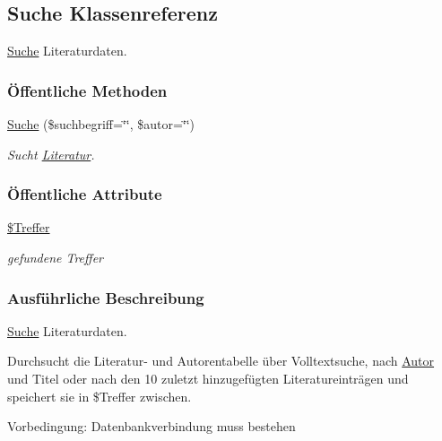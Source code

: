 \hypertarget{classSuche}{
\subsection{Suche Klassenreferenz}
\label{classSuche}
}
\hyperlink{classSuche}{Suche} Literaturdaten.  


\subsubsection*{\"{O}ffentliche Methoden}
\begin{CompactItemize}
\item 
\hyperlink{classSuche_277cd59d3689d6f0875d114be0024935}{Suche} (\$suchbegriff=\char`\"{}\char`\"{}, \$autor=\char`\"{}\char`\"{})
\begin{CompactList}\small\item\em Sucht \hyperlink{classLiteratur}{Literatur}. \item\end{CompactList}\end{CompactItemize}
\subsubsection*{\"{O}ffentliche Attribute}
\begin{CompactItemize}
\item 
\hyperlink{classSuche_0ee0e1ffb3f79392915fd39934d7140d}{\$Treffer}
\begin{CompactList}\small\item\em gefundene Treffer \item\end{CompactList}\end{CompactItemize}


\subsubsection{Ausf\"{u}hrliche Beschreibung}
\hyperlink{classSuche}{Suche} Literaturdaten. 

Durchsucht die Literatur- und Autorentabelle über Volltextsuche, nach \hyperlink{classAutor}{Autor} und Titel oder nach den 10 zuletzt hinzugefügten Literatureinträgen und speichert sie in \$Treffer zwischen. \begin{Desc}
\item[Vorbedingung:]Datenbankverbindung muss bestehen \end{Desc}




